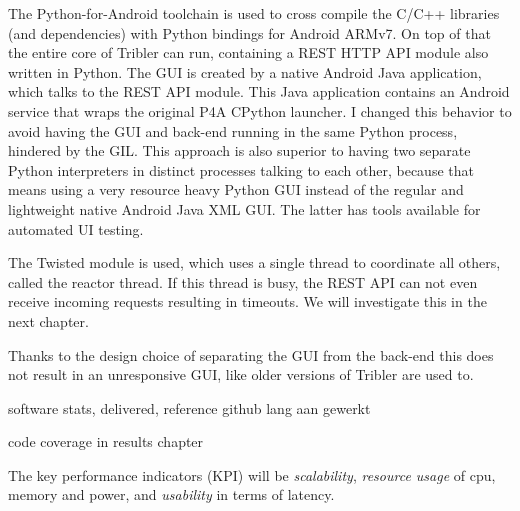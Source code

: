 The Python-for-Android toolchain is used to cross compile the C/C++ libraries (and dependencies) with Python bindings for Android ARMv7.
On top of that the entire core of Tribler can run, containing a REST HTTP API module also written in Python.
The GUI is created by a native Android Java application, which talks to the REST API module.
This Java application contains an Android service that wraps the original P4A CPython launcher.
I changed this behavior to avoid having the GUI and back-end running in the same Python process, hindered by the GIL.
This approach is also superior to having two separate Python interpreters in distinct processes talking to each other, because that means using a very resource heavy Python GUI instead of the regular and lightweight native Android Java XML GUI.
The latter has tools available for automated UI testing.



The Twisted module is used, which uses a single thread to coordinate all others, called the reactor thread.
If this thread is busy, the REST API can not even receive incoming requests resulting in timeouts.
We will investigate this in the next chapter.

Thanks to the design choice of separating the GUI from the back-end this does not result in an unresponsive GUI, like older versions of Tribler are used to.


software stats, delivered, reference github
lang aan gewerkt

code coverage in results chapter


The key performance indicators (KPI) will be \emph{scalability}, \emph{resource usage} of cpu, memory and power, and \emph{usability} in terms of latency.

